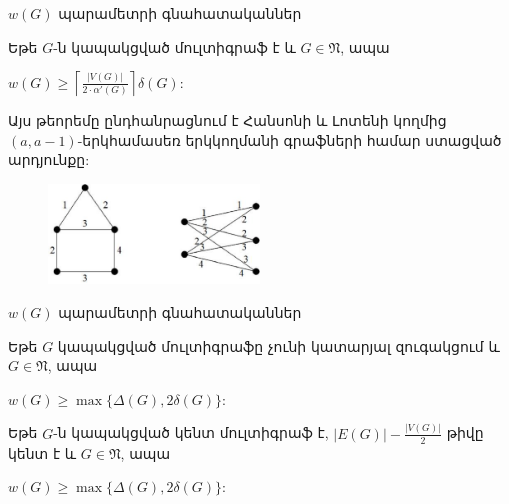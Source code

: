 \begin{frame}{$w(G)$ պարամետրի գնահատականներ}
\begin{theorem}[1.2.15]
Եթե $G$-ն կապակցված մուլտիգրաֆ է և $G\in \mathfrak{N}$, ապա
\begin{center}
$w(G)\geq \left\lceil \frac{\vert V(G)\vert}{2\cdot
\alpha'(G)}\right\rceil\delta(G)$:
\end{center}
\end{theorem}
Այս թեորեմը ընդհանրացնում է Հանսոնի և Լոտենի կողմից $(a,a-1)$-երկհամասեռ երկկողմանի գրաֆների համար ստացված արդյունքը:

\pause

\begin{figure}[h]
\begin{center}
\includegraphics[width=0.5\textwidth]{figures/W-bound-fig1.eps}
\end{center}
\end{figure}
\end{frame}


\begin{frame}{$w(G)$ պարամետրի գնահատականներ}
\begin{corollary}[1.2.16]
Եթե $G$ կապակցված մուլտիգրաֆը չունի կատարյալ զուգակցում և $G\in \mathfrak{N}$, ապա
\begin{center}
$w(G)\geq \max\{\Delta(G),2\delta(G)\}$:
\end{center}
\end{corollary}

\pause

\begin{theorem}[1.2.17]
Եթե $G$-ն կապակցված կենտ մուլտիգրաֆ է, $\vert
E(G)\vert-\frac{\vert V(G)\vert}{2}$ թիվը կենտ է և $G\in \mathfrak{N}$,
ապա
\begin{center}
$w(G)\geq \max\{\Delta(G),2\delta(G)\}$:
\end{center}
\end{theorem}
\end{frame}


